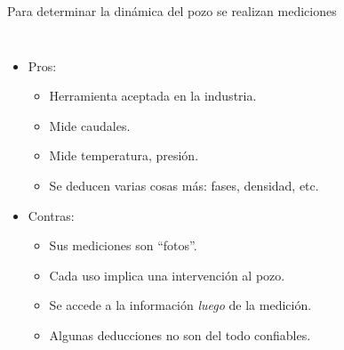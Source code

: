 \documentclass[presentation]{beamer}
\begin{document}
\begin{frame}{Para determinar la dinámica del pozo se realizan mediciones}
\begin{columns}
	\begin{itemize}
		\item Pros:
		\begin{itemize}
			\item Herramienta aceptada en la industria.
			\item Mide caudales.
			\item Mide temperatura, presión.
			\item Se deducen varias cosas más: fases, densidad, etc.
		\end{itemize}
		\item Contras:
		\begin{itemize}
			\item Sus mediciones son ``fotos''. 
			\item Cada uso implica una intervención al pozo.
			\item Se accede a la información \emph{luego} de la medición.
			\item Algunas deducciones no son del todo confiables.
		\end{itemize}
		
	\end{itemize}
\end{columns}
\end{frame}
\end{document}
